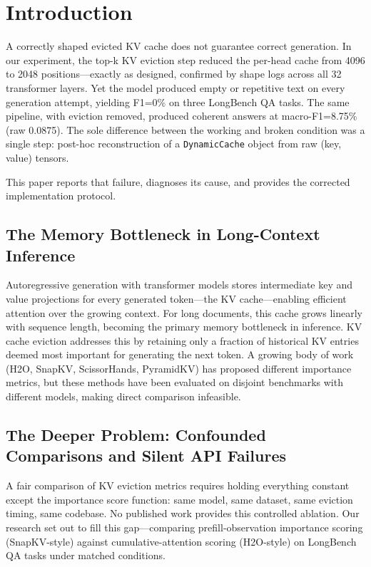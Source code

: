 \section{Introduction}

A correctly shaped evicted KV cache does not guarantee correct generation. In our experiment, the top-k KV eviction step reduced the per-head cache from 4096 to 2048 positions---exactly as designed, confirmed by shape logs across all 32 transformer layers. Yet the model produced empty or repetitive text on every generation attempt, yielding F1=0\% on three LongBench QA tasks. The same pipeline, with eviction removed, produced coherent answers at macro-F1=8.75\% (raw 0.0875). The sole difference between the working and broken condition was a single step: post-hoc reconstruction of a \texttt{DynamicCache} object from raw (key, value) tensors.

This paper reports that failure, diagnoses its cause, and provides the corrected implementation protocol.

\subsection{The Memory Bottleneck in Long-Context Inference}

Autoregressive generation with transformer models stores intermediate key and value projections for every generated token---the KV cache---enabling efficient attention over the growing context. For long documents, this cache grows linearly with sequence length, becoming the primary memory bottleneck in inference. KV cache eviction addresses this by retaining only a fraction of historical KV entries deemed most important for generating the next token. A growing body of work (H2O, SnapKV, ScissorHands, PyramidKV) has proposed different importance metrics, but these methods have been evaluated on disjoint benchmarks with different models, making direct comparison infeasible.

\subsection{The Deeper Problem: Confounded Comparisons and Silent API Failures}

A fair comparison of KV eviction metrics requires holding everything constant except the importance score function: same model, same dataset, same eviction timing, same codebase. No published work provides this controlled ablation. Our research set out to fill this gap---comparing prefill-observation importance scoring (SnapKV-style) against cumulative-attention scoring (H2O-style) on LongBench QA tasks under matched conditions.

